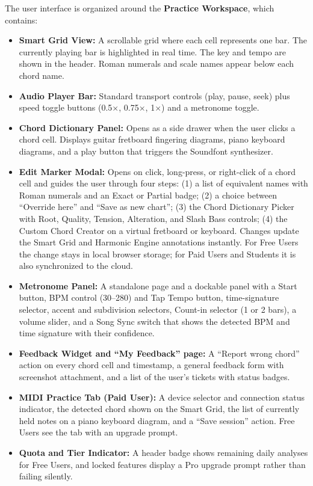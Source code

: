 \documentclass[a4paper]{article}
\begin{document}
The user interface is organized around the \textbf{Practice Workspace}, which contains:
\begin{itemize}
    \item \textbf{Smart Grid View:} A scrollable grid where each cell represents one bar. The currently playing bar is highlighted in real time. The key and tempo are shown in the header. Roman numerals and scale names appear below each chord name.
    \item \textbf{Audio Player Bar:} Standard transport controls (play, pause, seek) plus speed toggle buttons (0.5$\times$, 0.75$\times$, 1$\times$) and a metronome toggle.
    \item \textbf{Chord Dictionary Panel:} Opens as a side drawer when the user clicks a chord cell. Displays guitar fretboard fingering diagrams, piano keyboard diagrams, and a play button that triggers the Soundfont synthesizer.
    \item \textbf{Edit Marker Modal:} Opens on click, long-press, or right-click of a chord cell and guides the user through four steps: (1) a list of equivalent names with Roman numerals and an Exact or Partial badge; (2) a choice between ``Override here'' and ``Save as new chart''; (3) the Chord Dictionary Picker with Root, Quality, Tension, Alteration, and Slash Bass controls; (4) the Custom Chord Creator on a virtual fretboard or keyboard. Changes update the Smart Grid and Harmonic Engine annotations instantly. For Free Users the change stays in local browser storage; for Paid Users and Students it is also synchronized to the cloud.
    \item \textbf{Metronome Panel:} A standalone page and a dockable panel with a Start button, BPM control (30--280) and Tap Tempo button, time-signature selector, accent and subdivision selectors, Count-in selector (1 or 2 bars), a volume slider, and a Song Sync switch that shows the detected BPM and time signature with their confidence.
    \item \textbf{Feedback Widget and ``My Feedback'' page:} A ``Report wrong chord'' action on every chord cell and timestamp, a general feedback form with screenshot attachment, and a list of the user's tickets with status badges.
    \item \textbf{MIDI Practice Tab (Paid User):} A device selector and connection status indicator, the detected chord shown on the Smart Grid, the list of currently held notes on a piano keyboard diagram, and a ``Save session'' action. Free Users see the tab with an upgrade prompt.
    \item \textbf{Quota and Tier Indicator:} A header badge shows remaining daily analyses for Free Users, and locked features display a Pro upgrade prompt rather than failing silently.

\end{itemize}
\end{document}

